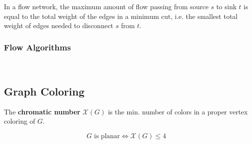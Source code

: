 \begin{theorem}
    
\end{theorem}

\begin{theorem}
    In a flow network, the maximum amount of flow passing from source $s$ to sink $t$ is equal to the total weight of the edges in a minimum cut, i.e. the smallest total weight of edges needed to disconnect $s$ from $t$.
\end{theorem}

\subsubsection{Flow Algorithms}

\

\subsection{Graph Coloring}

\begin{definition}
    The \textbf{chromatic number} $\mathcal{X}(G)$ is the min. number of colors in a proper vertex coloring of $G$.
\end{definition}

\begin{theorem}
    \[\displaystyle 
    G \text{ is planar} \iff \mathcal{X}(G) \leq 4
    \]
\end{theorem}